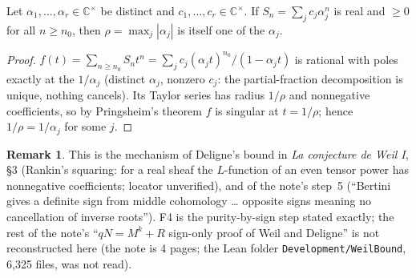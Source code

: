 \documentclass[11pt]{article}
\theoremstyle{definition}\newtheorem{definition}[theorem]{Definition}\newtheorem{remark}[theorem]{Remark}
\begin{document}
\begin{lemma}\label{F4} Let $\alpha_1,\dots,\alpha_r\in\mathbb C^\times$
be distinct and $c_1,\dots,c_r\in\mathbb C^\times$. If $S_n=\sum_jc_j\alpha_j^n$ is real and $\ge0$ for all $n\ge n_0$, then
$\rho=\max_j|\alpha_j|$ is itself one of the $\alpha_j$.\end{lemma}
\begin{proof} $f(t)=\sum_{n\ge n_0}S_nt^n=\sum_jc_j(\alpha_jt)^{n_0}/(1-\alpha_jt)$ is rational with poles exactly at the
$1/\alpha_j$ (distinct $\alpha_j$, nonzero $c_j$: the partial-fraction decomposition is unique, nothing cancels). Its Taylor
series has radius $1/\rho$ and nonnegative coefficients, so by Pringsheim's theorem $f$ is singular at $t=1/\rho$; hence
$1/\rho=1/\alpha_j$ for some $j$.\end{proof}
\begin{remark} This is the mechanism of Deligne's bound in \emph{La conjecture de Weil I}, \S3 (Rankin's squaring: for a real
sheaf the $L$-function of an even tensor power has nonnegative coefficients; locator unverified), and of the note's step~5
(``Bertini gives a definite sign from middle cohomology \dots{} opposite signs meaning no cancellation of inverse roots'').
F4 is the purity-by-sign step stated exactly; the rest of the note's ``$qN=M^k+R$ sign-only proof of Weil and Deligne'' is
not reconstructed here (the note is 4 pages; the Lean folder \texttt{Development/WeilBound}, 6{,}325 files, was not read).\end{remark}
\end{document}
